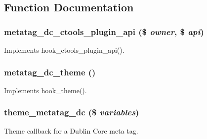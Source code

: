 \subsection{Function Documentation}
\hypertarget{metatag__dc_8module_ad13aa8542c256fc1688bb77690664935}{
\subsubsection[{metatag\_\-dc\_\-ctools\_\-plugin\_\-api}]{\setlength{\rightskip}{0pt plus 5cm}metatag\_\-dc\_\-ctools\_\-plugin\_\-api (\$ {\em owner}, \/  \$ {\em api})}}
\label{metatag__dc_8module_ad13aa8542c256fc1688bb77690664935}
Implements hook\_\-ctools\_\-plugin\_\-api(). \hypertarget{metatag__dc_8module_ab23a5108a08f5a66bfc7bb0916e5f565}{
\subsubsection[{metatag\_\-dc\_\-theme}]{\setlength{\rightskip}{0pt plus 5cm}metatag\_\-dc\_\-theme ()}}
\label{metatag__dc_8module_ab23a5108a08f5a66bfc7bb0916e5f565}
Implements hook\_\-theme(). \hypertarget{metatag__dc_8module_a412ba54840310828b63e2dc0c553dd4d}{
\subsubsection[{theme\_\-metatag\_\-dc}]{\setlength{\rightskip}{0pt plus 5cm}theme\_\-metatag\_\-dc (\$ {\em variables})}}
\label{metatag__dc_8module_a412ba54840310828b63e2dc0c553dd4d}
Theme callback for a Dublin Core meta tag. 